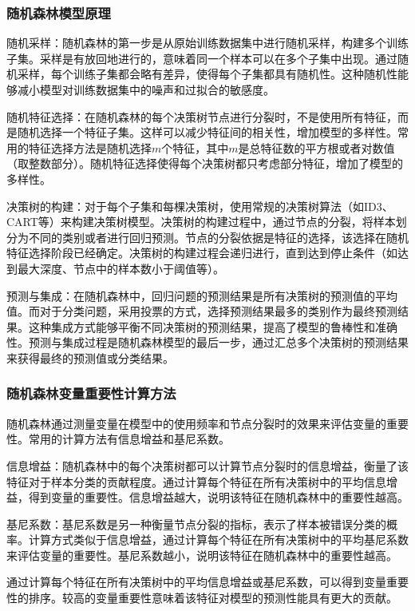 \subsubsection{随机森林模型原理}

随机采样：随机森林的第一步是从原始训练数据集中进行随机采样，构建多个训练子集。采样是有放回地进行的，意味着同一个样本可以在多个子集中出现。通过随机采样，每个训练子集都会略有差异，使得每个子集都具有随机性。这种随机性能够减小模型对训练数据集中的噪声和过拟合的敏感度。

随机特征选择：在随机森林的每个决策树节点进行分裂时，不是使用所有特征，而是随机选择一个特征子集。这样可以减少特征间的相关性，增加模型的多样性。常用的特征选择方法是随机选择$m$个特征，其中$m$是总特征数的平方根或者对数值（取整数部分）。随机特征选择使得每个决策树都只考虑部分特征，增加了模型的多样性。

决策树的构建：对于每个子集和每棵决策树，使用常规的决策树算法（如ID3、CART等）来构建决策树模型。决策树的构建过程中，通过节点的分裂，将样本划分为不同的类别或者进行回归预测。节点的分裂依据是特征的选择，该选择在随机特征选择阶段已经确定。决策树的构建过程会递归进行，直到达到停止条件（如达到最大深度、节点中的样本数小于阈值等）。

预测与集成：在随机森林中，回归问题的预测结果是所有决策树的预测值的平均值。而对于分类问题，采用投票的方式，选择预测结果最多的类别作为最终预测结果。这种集成方式能够平衡不同决策树的预测结果，提高了模型的鲁棒性和准确性。预测与集成过程是随机森林模型的最后一步，通过汇总多个决策树的预测结果来获得最终的预测值或分类结果\cite{随机森林算法优化研究}。
\subsubsection{随机森林变量重要性计算方法}

随机森林通过测量变量在模型中的使用频率和节点分裂时的效果来评估变量的重要性。常用的计算方法有信息增益和基尼系数。

信息增益：随机森林中的每个决策树都可以计算节点分裂时的信息增益，衡量了该特征对于样本分类的贡献程度。通过计算每个特征在所有决策树中的平均信息增益，得到变量的重要性。信息增益越大，说明该特征在随机森林中的重要性越高。

基尼系数：基尼系数是另一种衡量节点分裂的指标，表示了样本被错误分类的概率。计算方式类似于信息增益，通过计算每个特征在所有决策树中的平均基尼系数来评估变量的重要性。基尼系数越小，说明该特征在随机森林中的重要性越高。

通过计算每个特征在所有决策树中的平均信息增益或基尼系数，可以得到变量重要性的排序。较高的变量重要性意味着该特征对模型的预测性能具有更大的贡献\cite{随机森林算法优化研究}。

